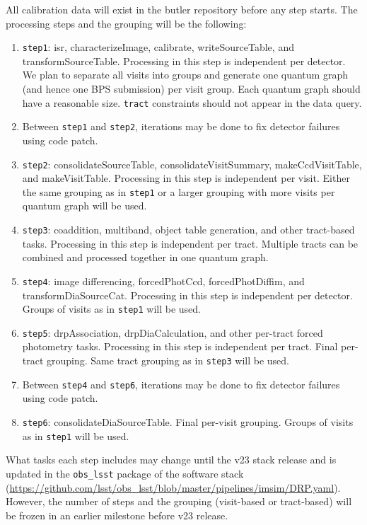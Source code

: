 All calibration data will exist in the butler repository before any step starts.
The processing steps and the grouping will be the following:
\begin{enumerate}
  \item \texttt{step1}: isr, characterizeImage, calibrate, writeSourceTable, and transformSourceTable. Processing in this step is independent per detector. We plan to separate all visits into groups and generate one quantum graph (and hence one BPS submission) per visit group. Each quantum graph should have a reasonable size.
\texttt{tract} constraints should not appear in the data query.
  \item Between \texttt{step1} and \texttt{step2}, iterations may be done to fix detector failures using code patch.
  \item \texttt{step2}: consolidateSourceTable, consolidateVisitSummary, makeCcdVisitTable, and makeVisitTable. Processing in this step is independent per visit. Either the same grouping as in \texttt{step1} or a larger grouping with more visits per quantum graph will be used.
  \item \texttt{step3}: coaddition, multiband, object table generation, and other tract-based tasks. Processing in this step is independent per tract. Multiple tracts can be combined and processed together in one quantum graph.
  \item \texttt{step4}: image differencing, forcedPhotCcd, forcedPhotDiffim, and transformDiaSourceCat. Processing in this step is independent per detector. Groups of visits as in \texttt{step1} will be used.
  \item \texttt{step5}: drpAssociation, drpDiaCalculation, and other per-tract forced photometry tasks.
Processing in this step is independent per tract.
Final per-tract grouping.
Same tract grouping as in \texttt{step3} will be used.
  \item Between \texttt{step4} and \texttt{step6}, iterations may be done to fix detector failures using code patch.
  \item \texttt{step6}: consolidateDiaSourceTable. Final per-visit grouping. Groups of visits as in \texttt{step1} will be used.
\end{enumerate}

What tasks each step includes may change until the v23 stack release and is updated in the \texttt{obs\_lsst} package of the software stack (\url{https://github.com/lsst/obs_lsst/blob/master/pipelines/imsim/DRP.yaml}).
However, the number of steps and the grouping (visit-based or tract-based) will be frozen in an earlier milestone before v23 release.


